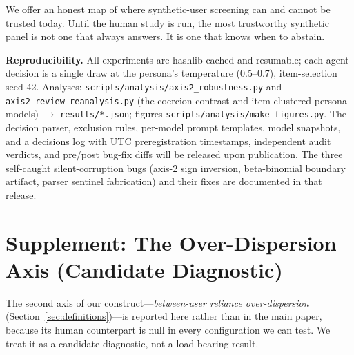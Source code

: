 \documentclass[manuscript,nonacm]{acmart}
\begin{document}
We offer an honest map of where synthetic-user screening can and cannot be trusted today. Until the human
study is run, the most trustworthy synthetic panel is not one that always answers. It is one that knows
when to abstain.

\begin{acks}
\textbf{Reproducibility.} All experiments are hashlib-cached and resumable; each agent decision is a single
draw at the persona's temperature (0.5--0.7), item-selection seed 42. Analyses:
\texttt{scripts/analysis/axis2\_robustness.py} and \texttt{axis2\_review\_reanalysis.py} (the coercion
contrast and item-clustered persona models) $\to$ \texttt{results/*.json}; figures
\texttt{scripts/analysis/make\_figures.py}. The decision parser, exclusion rules, per-model prompt
templates, model snapshots, and a decisions log with UTC preregistration timestamps, independent audit
verdicts, and pre/post bug-fix diffs will be released upon publication. The three self-caught silent-corruption bugs
(axis-2 sign inversion, beta-binomial boundary artifact, parser sentinel fabrication) and their fixes are
documented in that release.
\end{acks}




\appendix

\section{Supplement: The Over-Dispersion Axis (Candidate Diagnostic)}
\label{app:overdispersion}

The second axis of our construct---\emph{between-user reliance over-dispersion}
(Section~\ref{sec:definitions})---is reported here rather than in the main paper, because its human
counterpart is null in every configuration we can test. We treat it as a candidate diagnostic, not a
load-bearing result.
\end{document}
